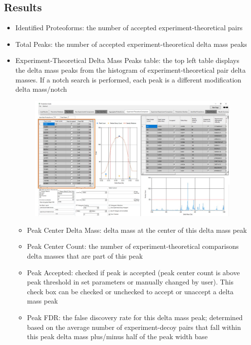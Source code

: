 \subsection{Results}
\begin{itemize}
	\item Identified Proteoforms: the number of accepted experiment-theoretical pairs
	\item Total Peaks: the number of accepted experiment-theoretical delta mass peaks
	\pagebreak
	\item Experiment-Theoretical Delta Mass Peaks table: the top left table displays the delta mass peaks from the histogram of experiment-theoretical pair delta masses. If a notch search is performed, each peak is a different modification delta mass/notch

	\begin{figure}[h]
\centering
\includegraphics[scale=0.46]{figures/et2.jpg}
\end{figure}
	\begin{itemize}
		\item Peak Center Delta Mass: delta mass at the center of this delta mass peak 
		\item Peak Center Count: the number of experiment-theoretical comparisons delta masses that are part of this peak
		\item Peak Accepted: checked if peak is accepted (peak center count is above peak threshold in set parameters or manually changed by user). This check box can be checked or unchecked to accept or unaccept a delta mass peak
		\item Peak FDR: the false discovery rate for this delta mass peak; determined based on the average number of experiment-decoy pairs that fall within this peak delta mass plus/minus half of the peak width base

\end{itemize}
\end{itemize}

